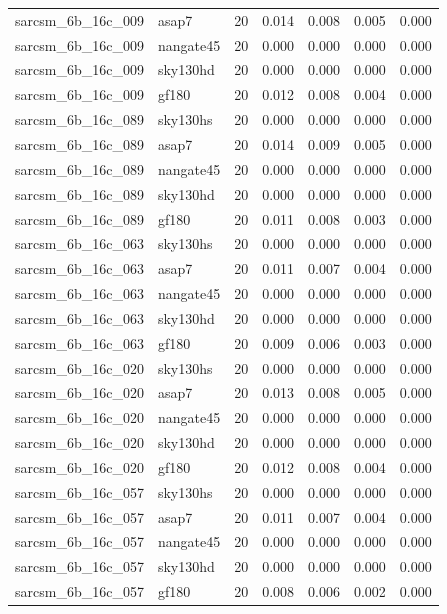 \begin{tabular}{llrrrrr}
sarcsm\_6b\_16c\_009 & asap7 & 20 & 0.014 & 0.008 & 0.005 & 0.000 \\
sarcsm\_6b\_16c\_009 & nangate45 & 20 & 0.000 & 0.000 & 0.000 & 0.000 \\
sarcsm\_6b\_16c\_009 & sky130hd & 20 & 0.000 & 0.000 & 0.000 & 0.000 \\
sarcsm\_6b\_16c\_009 & gf180 & 20 & 0.012 & 0.008 & 0.004 & 0.000 \\
sarcsm\_6b\_16c\_089 & sky130hs & 20 & 0.000 & 0.000 & 0.000 & 0.000 \\
sarcsm\_6b\_16c\_089 & asap7 & 20 & 0.014 & 0.009 & 0.005 & 0.000 \\
sarcsm\_6b\_16c\_089 & nangate45 & 20 & 0.000 & 0.000 & 0.000 & 0.000 \\
sarcsm\_6b\_16c\_089 & sky130hd & 20 & 0.000 & 0.000 & 0.000 & 0.000 \\
sarcsm\_6b\_16c\_089 & gf180 & 20 & 0.011 & 0.008 & 0.003 & 0.000 \\
sarcsm\_6b\_16c\_063 & sky130hs & 20 & 0.000 & 0.000 & 0.000 & 0.000 \\
sarcsm\_6b\_16c\_063 & asap7 & 20 & 0.011 & 0.007 & 0.004 & 0.000 \\
sarcsm\_6b\_16c\_063 & nangate45 & 20 & 0.000 & 0.000 & 0.000 & 0.000 \\
sarcsm\_6b\_16c\_063 & sky130hd & 20 & 0.000 & 0.000 & 0.000 & 0.000 \\
sarcsm\_6b\_16c\_063 & gf180 & 20 & 0.009 & 0.006 & 0.003 & 0.000 \\
sarcsm\_6b\_16c\_020 & sky130hs & 20 & 0.000 & 0.000 & 0.000 & 0.000 \\
sarcsm\_6b\_16c\_020 & asap7 & 20 & 0.013 & 0.008 & 0.005 & 0.000 \\
sarcsm\_6b\_16c\_020 & nangate45 & 20 & 0.000 & 0.000 & 0.000 & 0.000 \\
sarcsm\_6b\_16c\_020 & sky130hd & 20 & 0.000 & 0.000 & 0.000 & 0.000 \\
sarcsm\_6b\_16c\_020 & gf180 & 20 & 0.012 & 0.008 & 0.004 & 0.000 \\
sarcsm\_6b\_16c\_057 & sky130hs & 20 & 0.000 & 0.000 & 0.000 & 0.000 \\
sarcsm\_6b\_16c\_057 & asap7 & 20 & 0.011 & 0.007 & 0.004 & 0.000 \\
sarcsm\_6b\_16c\_057 & nangate45 & 20 & 0.000 & 0.000 & 0.000 & 0.000 \\
sarcsm\_6b\_16c\_057 & sky130hd & 20 & 0.000 & 0.000 & 0.000 & 0.000 \\
sarcsm\_6b\_16c\_057 & gf180 & 20 & 0.008 & 0.006 & 0.002 & 0.000 \\

\end{tabular}
